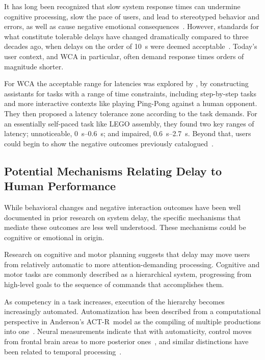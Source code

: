 \documentclass[10pt,letterpaper]{article}
\begin{document}
It has long been recognized that slow system response times can undermine cognitive processing, slow the pace of users, and lead to stereotyped behavior and errors, as well as cause negative emotional consequences~\autocite{dabrowsky:2011:40years}.
However, standards for what constitute tolerable delays have changed dramatically compared to three decades ago, when delays on the order of \SI{10}{\second} were deemed acceptable~\autocite{nielsen1994usability, shneiderman2016designing, seow2008designing}.
Today's user context, and WCA in particular, often demand response times orders of magnitude shorter.

For WCA the acceptable range for latencies was explored by \textcite{Chen:AnEmpiricalStudyOfLatency}, by constructing assistants for tasks with a range of time constraints, including step-by-step tasks and more interactive contexts like playing Ping-Pong against a human opponent.
They then proposed a latency tolerance zone according to the task demands.
For an essentially self-paced task like LEGO assembly, they found two key ranges of latency; unnoticeable, \SIrange{0}{0.6}{\second}; and impaired, \SIrange{0.6}{2.7}{\second}. 
Beyond that, users could begin to show the negative outcomes previously catalogued~\autocite{dabrowsky:2011:40years}.


\subsection{Potential Mechanisms Relating Delay to Human Performance}\label{ssec:potentialmechs}

While behavioral changes and negative interaction outcomes have been well documented in prior research on system delay, the specific  mechanisms that mediate these outcomes are less well understood. 
These mechanisms could be cognitive or emotional in origin.

Research on cognitive and motor planning suggests that delay may move users from relatively automatic to more attention-demanding processing.
Cognitive and motor tasks are commonly described as a hierarchical system, progressing from high-level goals to the sequence of commands that accomplishes them.

As competency in a task increases, execution of the hierarchy becomes increasingly automated.
Automatization has been described from a computational perspective in {Anderson's ACT-R}~model as the compiling of multiple productions into one~\autocite{neves1981knowledge}.
Neural measurements indicate that with automaticity, control moves from frontal brain areas to more posterior ones~\autocite{jeon2015degree,puttemans2005changes}, and similar distinctions have been related to temporal processing~\autocite{lewis2003distinct,koch2009neural,lee2019limiting}.
\end{document}
